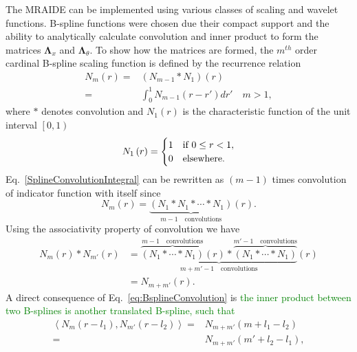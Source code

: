 \documentclass[journal,a4paper]{IEEEtran}
\newcommand{\dean}[1]{\textcolor{green}{#1}}
\begin{document}
The MRAIDE can be implemented using various classes of scaling and wavelet functions. B-spline functions were chosen due their compact support and the ability to analytically calculate convolution and inner product to form the matrices $ \boldsymbol\Lambda_x$ and $\boldsymbol \Lambda_{\theta}$. To show how the matrices are formed, the $m^{th}$ order cardinal B-spline scaling function is defined by the recurrence relation \cite{Chui1992} 
\begin{align}
N_{m}\left(r\right)=&\left(N_{m-1}\ast N_{1}\right)\left(r\right)\nonumber \\
=&\int_0^{1} N_{m-1}\left( r-r'\right)dr' \quad m>1,
\label{SplineConvolutionIntegral}
\end{align}
where $\ast$ denotes convolution and $N_1\left(r\right)$ is the characteristic function of the unit interval $\left[ 0,1\right)$
\begin{equation}
N_{1}\left(r\right)=
\begin{cases}
1 & \text{if $ 0\le r<1$}, \\
0 & \mathrm{elsewhere}.
\end{cases}
\end{equation}
Eq.~\ref{SplineConvolutionIntegral} can be rewritten as $(m-1)$ times convolution of indicator function with itself since
\begin{equation}
 N_{m}\left(r\right)=\underbrace{\left(N_{1}\ast N_{1}\ast \cdots \ast N_{1}\right)}_{m-1\quad \text{convolutions}}\left(r\right).
\end{equation}
Using the associativity property of convolution we have
\setlength{\arraycolsep}{0.0em}
\begin{align}\label{eq:BsplineConvolution}
N_{m}\left( r\right) \ast N_{m'}\left(r\right)&=\underbrace{\overbrace{\left(N_{1} \ast \cdots \ast N_{1}\right)}^{m-1 \quad \text{convolutions}}\left(r\right) \ast \overbrace{\left(N_{1} \ast \cdots \ast N_{1}\right)}^{m'-1\quad \text{convolutions}}}_{m+m'-1 \quad \text{convolutions}}\left(r\right)\nonumber\\
&=N_{m+m'}\left(r\right).
\end{align}
A direct consequence of Eq.~\eqref{eq:BsplineConvolution} is \dean{the inner product between two B-splines is another translated B-spline, such that}
\begin{align}
 \left\langle N_{m}\left(r-l_{1}\right), N_{m'}\left(r-l_{2}\right)\right\rangle=&N_{m+m'}\left(m+l_{1}-l_{2}\right)\nonumber \\
=&N_{m+m'}\left(m'+l_{2}-l_{1}\right),
\label{eq:BsplineInnerProduct}
\end{align}
\end{document}
